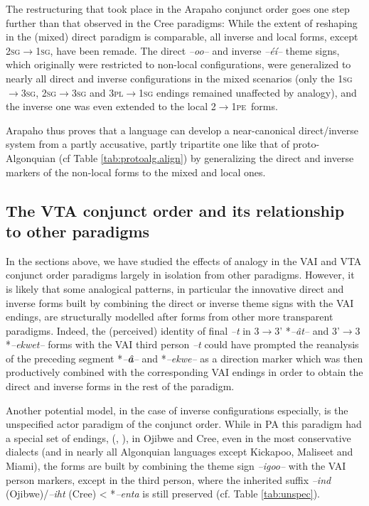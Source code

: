 \documentclass[twoside,a4paper,11pt]{article}
\newcommand{\ipa}[1]{{\phon\textit{#1}}}
\newcommand{\sg}{\textsc{sg}}
\newcommand{\pl}{\textsc{pl}}
\newcommand{\pe}{\textsc{pe}}
\begin{document}
The restructuring that took place in the Arapaho conjunct order goes one step further than that observed in the Cree paradigms: While the extent of reshaping in the (mixed) direct paradigm is comparable, all inverse and local forms, except 2\sg{}$\rightarrow$1\sg{}, have been remade. The direct \ipa{--oo--} and inverse \ipa{--éí--} theme signs, which originally were restricted to non-local configurations, were generalized to nearly all direct and inverse configurations in the mixed scenarios (only the 1\sg{}$\rightarrow$3\sg{}, 2\sg{}$\rightarrow$3\sg{} and 3\pl{}$\rightarrow$1\sg{} endings remained unaffected by analogy), and the inverse one was even extended to the local 2$\rightarrow$1\pe\ forms.

Arapaho thus proves that a language can develop a near-canonical direct/inverse system from a partly accusative, partly tripartite one like that of proto-Algonquian (cf Table \ref{tab:protoalg.align}) by generalizing the direct and inverse markers of the non-local forms to the mixed and local ones. 

\subsection{The VTA conjunct order and its relationship to other paradigms}
In the sections above, we have studied the effects of analogy in the VAI and VTA conjunct order paradigms largely in isolation from other paradigms. However, it is likely that some analogical patterns, in particular the innovative direct and inverse forms built by combining the direct or inverse theme signs with the VAI endings, are structurally modelled after forms from other more transparent paradigms. Indeed, the (perceived) identity of final  \ipa{--t}  in 3$\rightarrow$3' *\ipa{--ât--} and 3'$\rightarrow$3  *\ipa{--ekwet--} forms with the VAI third person \ipa{--t} could have prompted the reanalysis of the preceding segment *\ipa{--\textbf{â}--} and *\ipa{--ekwe--} as a direction marker which was then productively combined with the corresponding VAI endings in order to obtain the direct and inverse forms in the rest of the paradigm.

Another potential model, in the case of inverse configurations especially, is the unspecified actor paradigm of the conjunct order. While in PA this paradigm had a special set of endings, (\citealt[88]{goddard79comparative}, \citealt[156-7]{oxford14microparameters}), in Ojibwe and Cree, even in the most conservative dialects (and in nearly all Algonquian languages except Kickapoo, Maliseet and Miami), the forms are built by combining the theme sign \ipa{--igoo--} with the VAI person markers, except in the third person, where the inherited suffix \ipa{--ind} (Ojibwe)/\ipa{--iht} (Cree) < *\ipa{--enta} is still preserved (cf. Table \ref{tab:unspec}).
\end{document}
